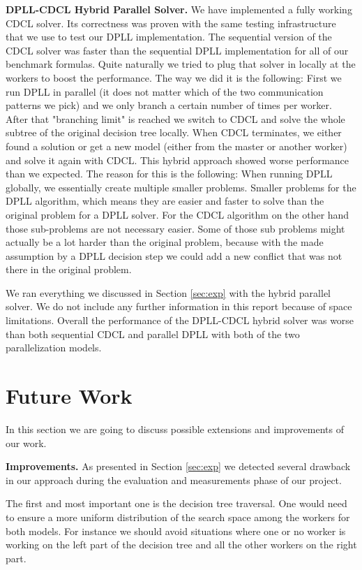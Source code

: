 \documentclass[letterpaper]{article}
\newcommand{\mypar}[1]{{\bf #1.}}
\begin{document}
\mypar{DPLL-CDCL Hybrid Parallel Solver}
We have implemented a fully working CDCL solver.
Its correctness was proven with the same testing infrastructure that we use to test our DPLL implementation.
The sequential version of the CDCL solver was faster than the sequential DPLL implementation for all of our benchmark formulas.
Quite naturally we tried to plug that solver in locally at the workers to boost the performance.
The way we did it is the following:
First we run DPLL in parallel (it does not matter which of the two communication patterns we pick) and we only branch a certain number of times per worker.
After that "branching limit" is reached we switch to CDCL and solve the whole subtree of the original decision tree locally.
When CDCL terminates, we either found a solution or get a new model (either from the master or another worker) and solve it again with CDCL.
This hybrid approach showed worse performance than we expected.
The reason for this is the following:
When running DPLL globally, we essentially create multiple smaller problems.
Smaller problems for the DPLL algorithm, which means they are easier and faster to solve than the original problem for a DPLL solver.
For the CDCL algorithm on the other hand those sub-problems are not necessary easier.
Some of those sub problems might actually be a lot harder than the original problem,
because with the made assumption by a DPLL decision step we could add a new conflict that was not there in the original problem.

We ran everything we discussed in Section \ref{sec:exp} with the hybrid parallel solver.
We do not include any further information in this report because of space limitations.
Overall the performance of the DPLL-CDCL hybrid solver was worse than both sequential CDCL and parallel DPLL with both of the two parallelization models.

\section{Future Work}\label{sec:futureWork}
In this section we are going to discuss possible extensions and improvements of our work.

\mypar{Improvements}
As presented in Section \ref{sec:exp} we detected several drawback in our approach during the evaluation and measurements phase of our project.

The first and most important one is the decision tree traversal.
One would need to ensure a more uniform distribution of the search space among the workers for both models.
For instance we should avoid situations where one or no worker is working on the left part of the decision tree and all the other workers on the right part.
\end{document}
